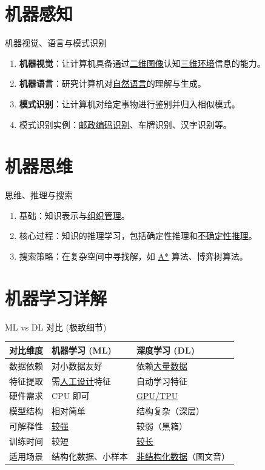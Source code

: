 \documentclass[11pt,a4paper]{ctexrep}
\newcommand{\fillblank}[1]{\underline{\hspace{2em}#1\hspace{2em}}}
\begin{document}
\section{机器感知}
\begin{qbox}{机器视觉、语言与模式识别}
    \begin{enumerate}
        \item \textbf{机器视觉}：让计算机具备通过\fillblank{二维图像}认知\fillblank{三维环境}信息的能力。
        \item \textbf{机器语言}：研究计算机对\fillblank{自然语言}的理解与生成。
        \item \textbf{模式识别}：让计算机对给定事物进行鉴别并归入相似模式。
        \item 模式识别实例：\fillblank{邮政编码识别}、车牌识别、汉字识别等。
    \end{enumerate}
\end{qbox}

\section{机器思维}
\begin{qbox}{思维、推理与搜索}
    \begin{enumerate}
        \item 基础：知识表示与\fillblank{组织管理}。
        \item 核心过程：知识的推理学习，包括确定性推理和\fillblank{不确定性推理}。
        \item 搜索策略：在复杂空间中寻找解，如 \fillblank{A*} 算法、博弈树算法。
    \end{enumerate}
\end{qbox}

\section{机器学习详解}
\begin{qbox}{ML vs DL 对比 (极致细节)}
    \begin{longtable}{@{}lll@{}}
        \toprule
        对比维度 & 机器学习 (ML) & 深度学习 (DL) \\
        \midrule
        数据依赖 & 对小数据友好 & 依赖\fillblank{大量数据} \\
        特征提取 & 需\fillblank{人工设计}特征 & 自动学习特征 \\
        硬件需求 & CPU 即可 & \fillblank{GPU/TPU} \\
        模型结构 & 相对简单 & 结构复杂（深层） \\
        可解释性 & \fillblank{较强} & 较弱（黑箱） \\
        训练时间 & 较短 & \fillblank{较长} \\
        适用场景 & 结构化数据、小样本 & \fillblank{非结构化数据}（图文音） \\
        \bottomrule
    \end{longtable}
\end{qbox}
\end{document}

